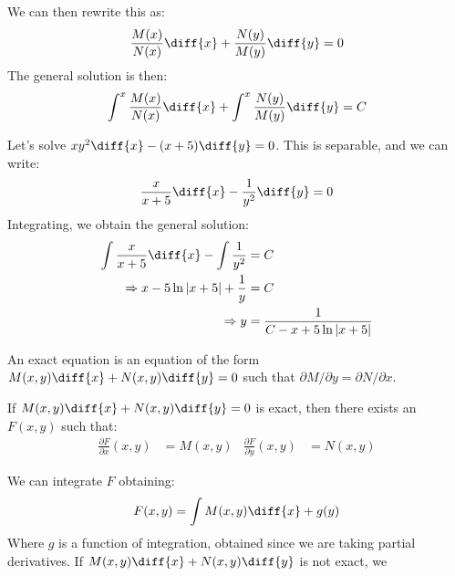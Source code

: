 \documentclass[crop=false,class=article,oneside]{standalone}
\begin{document}
        We can then rewrite this as:
        \begin{equation*}
            \frac{M(x)}{N(x)}\diff{x}+\frac{N(y)}{M(y)}\diff{y}=0
        \end{equation*}
        The general solution is then:
        \begin{equation*}
            \int^{x}\frac{M(x)}{N(x)}\diff{x}+
            \int^{x}\frac{N(y)}{M(y)}\diff{y}=C
        \end{equation*}
        \begin{example}
            Let's solve $xy^{2}\diff{x}-(x+5)\diff{y}=0$.
            This is separable, and we can write:
            \begin{equation*}
                \frac{x}{x+5}\diff{x}-\frac{1}{y^{2}}\diff{y}=0
            \end{equation*}
            Integrating, we obtain the general solution:
            \begin{align*}
                \int\frac{x}{x+5}\diff{x}-\int\frac{1}{y^{2}}
                &=C\\
                \Rightarrow
                x-5\ln|x+5|+\frac{1}{y}&=C\\
                \Rightarrow
                y&=\frac{1}{C-x+5\ln|x+5|}
            \end{align*}
        \end{example}
        \begin{definition}
            An exact equation is an equation of the form
            $M(x,y)\diff{x}+N(x,y)\diff{y}=0$ such that
            $\partial{M}/\partial{y}=\partial{N}/\partial{x}$.
        \end{definition}
        \begin{theorem}
            If $M(x,y)\diff{x}+N(x,y)\diff{y}=0$ is exact,
            then there exists an $F(x,y)$ such that:
            \begin{align*}
                \frac{\partial{F}}{\partial{x}}(x,y)&=M(x,y)
                &
                \frac{\partial{F}}{\partial{y}}(x,y)&=N(x,y)
            \end{align*}
        \end{theorem}
        We can integrate $F$ obtaining:
        \begin{equation*}
            F(x,y)=\int{M(x,y)\diff{x}}+g(y)
        \end{equation*}
        Where $g$ is a function of integration, obtained
        since we are taking partial derivatives.
        If $M(x,y)\diff{x}+N(x,y)\diff{y}$ is not exact, we
\end{document}

